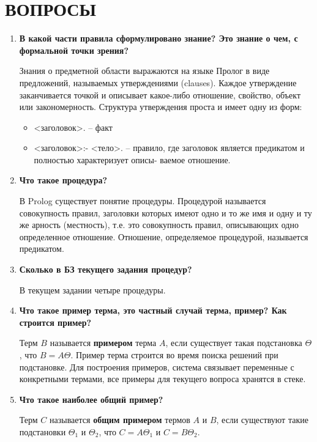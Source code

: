 \section{ВОПРОСЫ}

\begin{enumerate}
    \item \textbf{В какой части правила сформулировано знание? Это знание о чем, с формальной точки зрения?}

        Знания о предметной области выражаются на языке Пролог в виде предложений, называемых утверждениями (clauses). Каждое утверждение заканчивается точкой и описывает какое-либо отношение, свойство, объект или закономерность. Структура утверждения проста и имеет одну из форм:
        \begin{itemize}
            \item <заголовок>. -- факт
            \item <заголовок>:- <тело>. -- правило, где заголовок является предикатом и полностью характеризует описы- ваемое отношение.
        \end{itemize}

    \item \textbf{Что такое процедура?}

        В Prolog существует понятие процедуры. Процедурой называется совокупность правил, заголовки которых имеют одно и то же имя и одну и ту же арность (местность), т.е. это совокупность правил, описывающих одно определенное отношение. Отношение, определяемое процедурой, называется предикатом.

    \item \textbf{Сколько в БЗ текущего задания процедур?}

        В текущем задании четыре процедуры.

    \item \textbf{Что такое пример терма, это частный случай терма, пример? Как строится пример? }

        Терм $B$ называется \textbf{примером} терма $A$, если существует такая подстановка $\Theta$, что $B = A\Theta$. Пример терма строится во время поиска решений при подстановке. Для построения примеров, система связывает переменные с конкретными термами, все примеры для текущего вопроса хранятся в стеке.

    \item \textbf{Что такое наиболее общий пример?}

        Терм $C$ называется \textbf{общим примером} термов $A$ и $B$, если существуют такие подстановки $\Theta_1$ и $\Theta_2$, что $C = A\Theta_1$ и $C=B\Theta_2$.


\end{enumerate}
